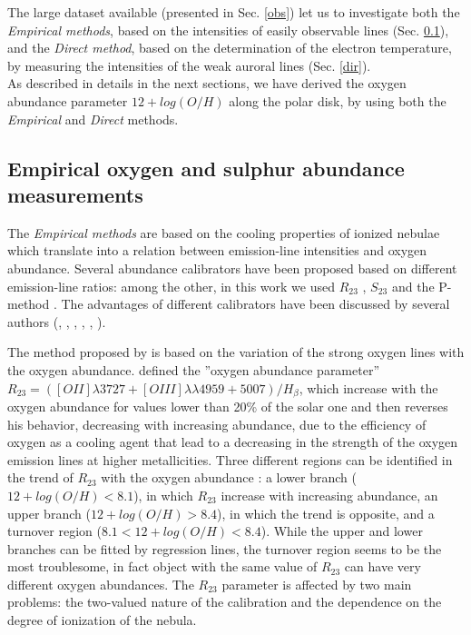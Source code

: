 \documentclass[12pt,preprint]{aastex}
\begin{document}
The large dataset available (presented
in Sec. \ref{obs}) let us to investigate both the \emph{Empirical
methods}, based on the intensities of easily observable lines
(Sec. \ref{Emp}), and the \emph{Direct method}, based on the
determination of the electron temperature, by measuring the intensities
of the weak auroral lines (Sec. \ref{dir}).\\ As described in details
in the next sections, we have derived the oxygen abundance parameter
$12+log(O/H)$ along the polar disk, by using both the
\emph{Empirical} and \emph{Direct} methods.


\subsection{Empirical oxygen and sulphur abundance
measurements}\label{Emp}

The \emph{Empirical methods} are based on the cooling properties
of ionized nebulae which translate into a relation between
emission-line intensities and oxygen abundance. Several abundance
calibrators have been proposed based on different emission-line
ratios: among the other, in this work we used $R_{23}$
\citep{Pag79}, $S_{23}$ \citep{Diaz00} and the P-method
\citep{Pil01}. The advantages of different calibrators have been
discussed by several authors (\citealt{Diaz00}, \citealt{Kob99},
\citealt{Kob04}, \citealt{Per05}, \citealt{Kew08}, \citealt{Hid09}).

The method proposed by \citet{Pag79} is based on the variation of
the strong oxygen lines with the oxygen abundance. \citet{Pag79}
defined the ''oxygen abundance parameter'' $R_{23} = ([OII]\lambda
3727 + [OIII]\lambda \lambda 4959 + 5007)/H_{\beta}$, which
increase with the oxygen abundance for values lower than 20\% of
the solar one and then reverses his behavior, decreasing with
increasing abundance, due to the efficiency of oxygen as a cooling
agent that lead to a decreasing in the strength of the oxygen
emission lines at higher metallicities. Three different regions
can be identified in the trend of $R_{23}$ with the oxygen
abundance \citep{Per05}: a lower branch ($12 + log(O/H) < 8.1$),
in which $R_{23}$ increase with increasing abundance, an upper
branch ($12 + log(O/H) > 8.4$), in which the trend is opposite,
and a turnover region ($8.1 < 12 + log(O/H) < 8.4$). While the
upper and lower branches can be fitted by regression lines, the
turnover region seems to be the most troublesome, in fact object
with the same value of $R_{23}$ can have very different oxygen
abundances. The $R_{23}$ parameter is affected by two main
problems: the two-valued nature of the calibration and the
dependence on the degree of ionization of the nebula.
\end{document}
